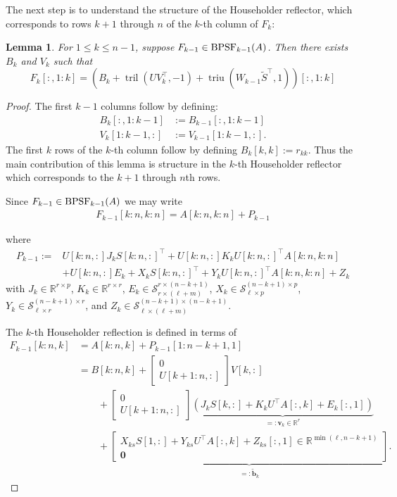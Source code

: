 \documentclass[a4paper,fleqn]{cas-sc}
\newtheorem{lemma}{Lemma}
\def\bbR{{\mathbb R}}
\def\calS{{\mathcal S}}
\def\bfb{{\mathbf b}}
\def\bfv{{\mathbf v}}
\def\bfzero{{\bm0}}
\DeclareMathOperator{\triu}{triu}
\DeclareMathOperator{\tril}{tril}
\begin{document}
The next step is to understand the structure of the Householder reflector, which corresponds to rows $k+1$ through $n$ of
the $k$-th column of $F_k$:

\begin{lemma} \label{lemma:lower}
    For $1\leq k \leq n-1$, suppose $F_{k-1}  \in {\rm BPSF}_{k-1}(A)$. Then there exists $B_k$ and $V_k$ such that
\[
F_k[:,1\!:\!k] = (B_k + \tril(U V_k^\top, -1) + \triu(W_{k-1} \tilde S^\top,1))[:,1\!:\!k]
\]
\end{lemma}
\begin{proof}
The first $k-1$ columns follow by defining:
\begin{align*}
B_k[:,1\!:\!k\!-\!1] &:= B_{k-1}[:,1\!:\!k\!-\!1] \\
V_k[1\!:\!k\!-\!1,:] &:= V_{k-1}[1\!:\!k\!-\!1,:].
\end{align*}
The first $k$ rows of the $k$-th column follow by defining $B_k[k,k] := r_{kk}$. Thus the main contribution of this lemma is structure in the $k$-th Householder reflector which corresponds to the $k+1$ through $n$th rows.

Since $F_{k-1}  \in {\rm BPSF}_{k-1}(A)$ we may write
\begin{align*}
    F_{k-1}[k:n,k:n] = A[k:n,k:n] + P_{k-1}
\end{align*}

where
\begin{align*}
 P_{k-1} := & U[k:n,:]J_kS[k:n,:]^\top + U[k:n,:]K_kU[k:n,:]^\top A[k:n,k:n]\\&+U[k:n,:]E_k+X_kS[k:n,:]^\top + Y_kU[k:n,:]^\top A[k:n,k:n] + Z_k
\end{align*}
with $J_k\in \mathbb R^{r\times p}$, $K_k\in \mathbb R^{r\times r}$, $E_k\in \calS^{r\times (n-k+1)}_{r\times (\ell+m)}$, $X_k\in \calS^{(n-k+1)\times p}_{\ell\times p}$, $Y_k\in \calS^{(n-k+1)\times r}_{\ell \times r}$, and $Z_k \in \calS^{(n-k+1)\times(n-k+1)}_{\ell \times(\ell+m)}$.


The $k$-th Householder reflection is defined in terms of
\begin{align}
F_{k-1}[k:n,k] &= A[k:n,k] +   P_{k-1}[1:n-k+1, 1] \nonumber\\
&= B[k\!:\!n,k] + \begin{bmatrix}
0\\
    U[k+1\!:\!n,:] 
\end{bmatrix} V[k,:] \nonumber\\
& \qquad +  \begin{bmatrix}
0 \\
    U[k+1\!:\!n,:] 
\end{bmatrix} \underbrace{(J_k S[k,:] + K_k U^\top A[:,k] + E_k[:,1])}_{=: \bfv_k \in \bbR^r}
\nonumber\\ \label{eq:tilde_b_k}
&\qquad + \underbrace{\begin{bmatrix}
    X_{ks} S[1,:] + Y_{ks} U^\top A[:,k] +Z_{ks}[:,1] \in \bbR^{\min(\ell,n-k+1)} \\ \bfzero
\end{bmatrix}}_{=: \tilde \bfb_k}.
\end{align}



\end{proof}
\end{document}

